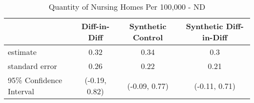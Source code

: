 \begin{table}[ht]
\centering
\begin{tabular}{lccc}
  \hline
 & Diff-in-Diff & Synthetic Control & Synthetic Diff-in-Diff \\ 
  \hline
estimate & 0.32 & 0.34 & 0.3 \\ 
  standard error & 0.26 & 0.22 & 0.21 \\ 
  95\% Confidence Interval & (-0.19, 0.82) & (-0.09, 0.77) & (-0.11, 0.71) \\ 
   \hline
\end{tabular}
\caption{Quantity of Nursing Homes Per 100,000 - ND} 
\end{table}
